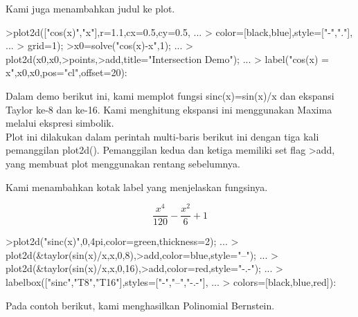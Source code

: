 \documentclass[12pt,arial,letterpaper]{book}
\begin{document}
\begin{eulernootebook}
\begin{eulercomment}
\begin{eulercomment}
\begin{eulernootebook}
\begin{eulercomment}
\begin{eulercomment}
\begin{eulercomment}
\begin{eulercomment}
\begin{eulercomment}
\begin{eulercomment}
\begin{eulercomment}
\begin{eulernotebook}
\begin{eulercomment}
\begin{eulercomment}
\begin{eulercomment}
\begin{eulercomment}
\begin{eulercomment}
Kami juga menambahkan judul ke plot.
\end{eulercomment}
\begin{eulerprompt}
>plot2d(["cos(x)","x"],r=1.1,cx=0.5,cy=0.5, ...
>  color=[black,blue],style=["-","."], ...
>  grid=1);
>x0=solve("cos(x)-x",1);  ...
>  plot2d(x0,x0,>points,>add,title="Intersection Demo");  ...
>  label("cos(x) = x",x0,x0,pos="cl",offset=20):
\end{eulerprompt}
\begin{eulercomment}
Dalam demo berikut ini, kami memplot fungsi sinc(x)=sin(x)/x dan
ekspansi Taylor ke-8 dan ke-16. Kami menghitung ekspansi ini
menggunakan Maxima melalui ekspresi simbolik.\\
Plot ini dilakukan dalam perintah multi-baris berikut ini dengan tiga
kali pemanggilan plot2d(). Pemanggilan kedua dan ketiga memiliki set
flag \textgreater{}add, yang membuat plot menggunakan rentang sebelumnya.

Kami menambahkan kotak label yang menjelaskan fungsinya.
\end{eulercomment}
\begin{eulerformula}
\[
\frac{x^4}{120}-\frac{x^2}{6}+1
\]
\end{eulerformula}
\begin{eulerprompt}
>plot2d("sinc(x)",0,4pi,color=green,thickness=2); ...
>  plot2d(&taylor(sin(x)/x,x,0,8),>add,color=blue,style="--"); ...
>  plot2d(&taylor(sin(x)/x,x,0,16),>add,color=red,style="-.-"); ...
>  labelbox(["sinc","T8","T16"],styles=["-","--","-.-"], ...
>    colors=[black,blue,red]):
\end{eulerprompt}
\begin{eulercomment}
Pada contoh berikut, kami menghasilkan Polinomial Bernstein.


\end{eulercomment}
\end{eulercomment}
\end{eulercomment}
\end{eulercomment}
\end{eulercomment}
\end{eulernotebook}
\end{eulercomment}
\end{eulercomment}
\end{eulercomment}
\end{eulercomment}
\end{eulercomment}
\end{eulercomment}
\end{eulercomment}
\end{eulernootebook}
\end{eulercomment}
\end{eulercomment}
\end{eulernootebook}
\end{document}
